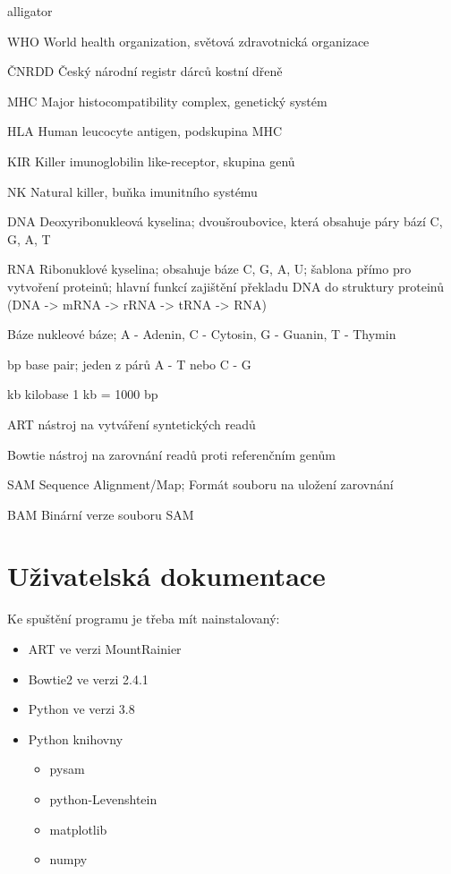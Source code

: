 \documentclass[czech,DP]{thesiskiv}
\numberwithin{equation}{section}
\begin{document}
\begin{labeling}{alligator}
	\item [WHO] World health organization, světová zdravotnická organizace
	\item [ČNRDD] Český národní registr dárců kostní dřeně
	\item [MHC] Major histocompatibility complex, genetický systém	
	\item [HLA] Human leucocyte antigen, podskupina MHC
	\item [KIR] Killer imunoglobilin like-receptor, skupina genů
	\item [NK] Natural killer, buňka imunitního systému
	\item [DNA] Deoxyribonukleová kyselina; dvoušroubovice, která obsahuje páry bází C, G, A, T 
	\item [RNA] Ribonuklové kyselina; obsahuje báze C, G, A, U; šablona přímo pro vytvoření proteinů; hlavní funkcí zajištění překladu DNA do struktury proteinů (DNA -> mRNA -> rRNA -> tRNA -> RNA) 
	\item [Báze] nukleové báze; A - Adenin, C - Cytosin, G - Guanin, T - Thymin
	\item [bp] base pair; jeden z párů A - T nebo C - G
	\item [kb] kilobase 1 kb = 1000 bp
	\item [ART] nástroj na vytváření syntetických readů
	\item [Bowtie] nástroj na zarovnání readů proti referenčním genům
	\item [SAM] Sequence Alignment/Map; Formát souboru na uložení zarovnání
	\item [BAM] Binární verze souboru SAM
\end{labeling}


% 
%
\nocite{*}

{\raggedright\small

}


\appendix
\chapter{Uživatelská dokumentace}
Ke spuštění programu je třeba mít nainstalovaný:
\begin{itemize}
\item ART ve verzi MountRainier
\item Bowtie2 ve verzi 2.4.1
\item Python ve verzi 3.8
\item Python knihovny 
	\begin{itemize}
		\item pysam 
		\item python-Levenshtein
		\item matplotlib
		\item numpy
	\end{itemize}
\end{itemize}
\end{document}

